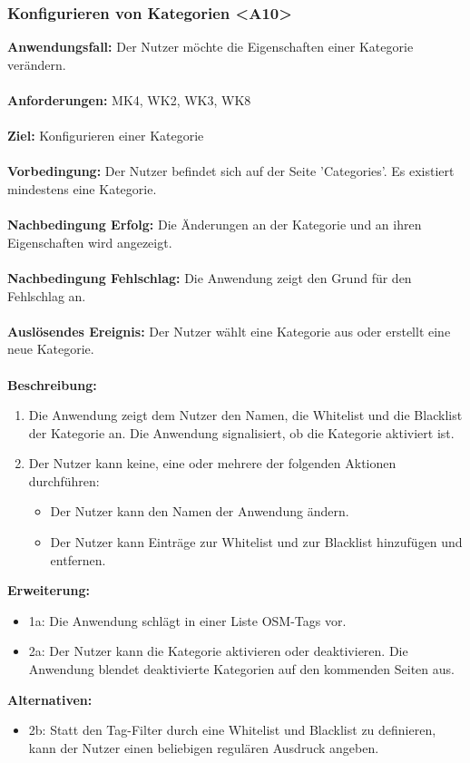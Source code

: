 \documentclass[parskip=full]{scrartcl} %
\begin{document}
\subsubsection*{Konfigurieren von Kategorien <A10>}
\textbf{Anwendungsfall:} Der Nutzer möchte die Eigenschaften einer Kategorie verändern.\\\\
\textbf{Anforderungen:} MK4, WK2, WK3, WK8\\\\
\textbf{Ziel:} Konfigurieren einer Kategorie \\\\
\textbf{Vorbedingung:} Der Nutzer befindet sich auf der Seite 'Categories'. Es existiert mindestens eine Kategorie.\\\\
\textbf{Nachbedingung Erfolg:} Die Änderungen an der Kategorie und an ihren Eigenschaften wird angezeigt. \\\\
\textbf{Nachbedingung Fehlschlag:} Die Anwendung zeigt den Grund für den Fehlschlag an. \\\\
\textbf{Auslösendes Ereignis:} Der Nutzer wählt eine Kategorie aus oder erstellt eine neue Kategorie. \\\\
\textbf{Beschreibung:}
\begin{enumerate}
    \item Die Anwendung zeigt dem Nutzer den Namen, die Whitelist und die Blacklist der Kategorie an. Die Anwendung signalisiert, ob die Kategorie aktiviert ist.
    \item Der Nutzer kann keine, eine oder mehrere der folgenden Aktionen durchführen:
    \begin{itemize}
        \item Der Nutzer kann den Namen der Anwendung ändern.
        \item Der Nutzer kann Einträge zur Whitelist und zur Blacklist hinzufügen und entfernen.
    \end{itemize}
\end{enumerate}
\textbf{Erweiterung:}
\begin{itemize}
    \item 1a: Die Anwendung schlägt in einer Liste OSM-Tags vor.
    \item 2a: Der Nutzer kann die Kategorie aktivieren oder deaktivieren. Die Anwendung blendet deaktivierte Kategorien auf den kommenden Seiten aus.
\end{itemize}
\textbf{Alternativen:}
\begin{itemize}
    \item 2b: Statt den Tag-Filter durch eine Whitelist und Blacklist zu definieren, kann der Nutzer einen beliebigen regulären Ausdruck angeben.
\end{itemize}
\newpage
\end{document}
